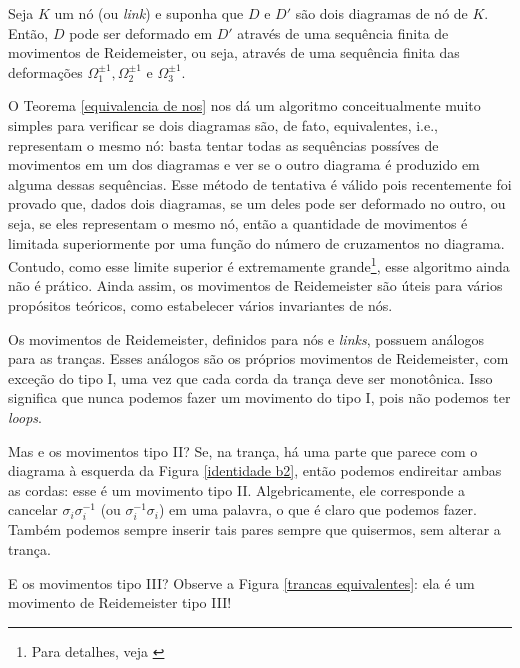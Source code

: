 	\begin{theorem}
		\label{equivalencia de nos}
		Seja $K$ um nó (ou \textit{link}) e suponha que $D$ e $D'$ são dois diagramas de nó de $K$. Então, $D$ pode ser deformado em $D'$ através de uma sequência finita de movimentos de Reidemeister, ou seja, através de uma sequência finita das deformações $\Omega_1^{\pm1}, \Omega_2^{\pm1}$ e $\Omega_3^{\pm1}$. 
	\end{theorem}  
	
	\par\vspace{0.3cm} O Teorema \eqref{equivalencia de nos} nos dá um algoritmo conceitualmente muito simples para verificar se dois diagramas são, de fato, equivalentes, i.e., representam o mesmo nó: basta tentar todas as sequências possíves de movimentos em um dos diagramas e ver se o outro diagrama é produzido em alguma dessas sequências. Esse método de tentativa é válido pois recentemente foi provado que, dados dois diagramas, se um deles pode ser deformado no outro, ou seja, se eles representam o mesmo nó, então a quantidade de movimentos é limitada superiormente por uma função do número de cruzamentos no diagrama. Contudo, como esse limite superior é extremamente grande\footnote{Para detalhes, veja \cite{limite-superior-1, limite-superior-2, limite-superior-3}}, esse algoritmo ainda não é prático. Ainda assim, os movimentos de Reidemeister são úteis para vários propósitos teóricos, como estabelecer vários invariantes de nós.
	\par\vspace{0.3cm} Os movimentos de Reidemeister, definidos para nós e \textit{links}, possuem análogos para as tranças. Esses análogos são os próprios movimentos de Reidemeister, com exceção do tipo I, uma vez que cada corda da trança deve ser monotônica. Isso significa que nunca podemos fazer um movimento do tipo I, pois não podemos ter \textit{loops}.  
	\par\vspace{0.3cm} Mas e os movimentos tipo II? Se, na trança, há uma parte que parece com o diagrama à esquerda da Figura \eqref{identidade b2}, então podemos endireitar ambas as cordas: esse é um movimento tipo II. Algebricamente, ele corresponde a cancelar $\sigma_i\sigma_i^{-1}$ (ou $\sigma_i^{-1}\sigma_i$) em uma palavra, o que é claro que podemos fazer. Também podemos sempre inserir tais pares sempre que quisermos, sem alterar a trança.
	\par\vspace{0.3cm} E os movimentos tipo III? Observe a Figura \eqref{trancas equivalentes}: ela é um movimento de Reidemeister tipo III!
